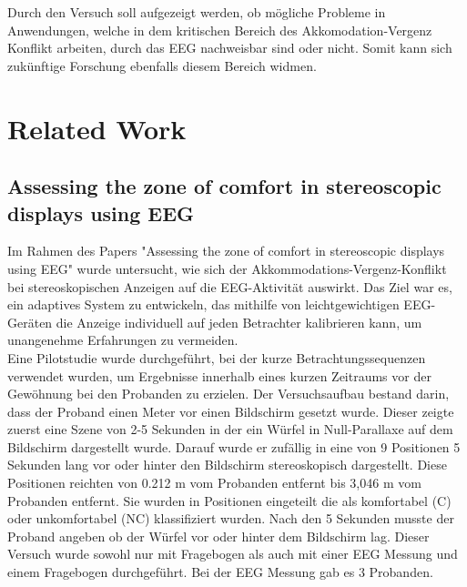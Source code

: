 \documentclass[conference]{IEEEtran}
\begin{document}
Durch den Versuch soll aufgezeigt werden, ob mögliche Probleme in Anwendungen, welche in dem kritischen Bereich des Akkomodation-Vergenz Konflikt arbeiten, durch das EEG nachweisbar sind oder nicht. Somit kann sich zukünftige Forschung ebenfalls diesem Bereich widmen.

\section{Related Work}
\subsection{Assessing the zone of comfort in stereoscopic displays using EEG}
Im Rahmen des Papers "Assessing the zone of comfort in stereoscopic displays using EEG" \cite{b1} wurde untersucht, wie sich der Akkommodations-Vergenz-Konflikt bei stereoskopischen Anzeigen auf die EEG-Aktivität auswirkt. Das Ziel war es, ein adaptives System zu entwickeln, das mithilfe von leichtgewichtigen EEG-Geräten die Anzeige individuell auf jeden Betrachter kalibrieren kann, um unangenehme Erfahrungen zu vermeiden.\\ 
Eine Pilotstudie wurde durchgeführt, bei der kurze Betrachtungssequenzen verwendet wurden, um Ergebnisse innerhalb eines kurzen Zeitraums vor der Gewöhnung bei den Probanden zu erzielen. Der Versuchsaufbau bestand darin, dass der Proband einen Meter vor einen Bildschirm gesetzt wurde. Dieser zeigte zuerst eine Szene von 2-5 Sekunden in der ein Würfel in Null-Parallaxe auf dem Bildschirm dargestellt wurde. Darauf wurde er zufällig in eine von 9 Positionen 5 Sekunden lang vor oder hinter den Bildschirm stereoskopisch dargestellt. Diese Positionen reichten von 0.212 m vom Probanden entfernt bis 3,046 m vom Probanden entfernt. Sie wurden in Positionen eingeteilt die als komfortabel (C) oder unkomfortabel (NC) klassifiziert wurden. Nach den 5 Sekunden musste der Proband angeben ob der Würfel vor oder hinter dem Bildschirm lag. Dieser Versuch wurde sowohl nur mit Fragebogen als auch mit einer EEG Messung und einem Fragebogen durchgeführt. Bei der EEG Messung gab es 3 Probanden.\\ 
\end{document}
